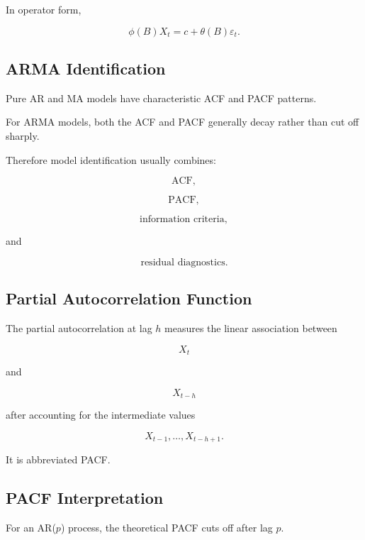 In operator form,

\[
\boxed{
\phi(B)X_t
=
c
+
\theta(B)\varepsilon_t.
}
\]

\subsection{ARMA Identification}
\label{subsec:arma-identification}

Pure AR and MA models have characteristic ACF and PACF patterns.

For ARMA models, both the ACF and PACF generally decay rather than cut off
sharply.

Therefore model identification usually combines:

\[
\boxed{
\text{ACF},
}
\]

\[
\boxed{
\text{PACF},
}
\]

\[
\boxed{
\text{information criteria},
}
\]

and

\[
\boxed{
\text{residual diagnostics}.
}
\]

\subsection{Partial Autocorrelation Function}
\label{subsec:partial-autocorrelation}

The partial autocorrelation at lag \(h\) measures the linear association
between

\[
X_t
\]

and

\[
X_{t-h}
\]

after accounting for the intermediate values

\[
X_{t-1},
\ldots,
X_{t-h+1}.
\]

It is abbreviated PACF.

\subsection{PACF Interpretation}
\label{subsec:pacf-interpretation}

For an AR(\(p\)) process, the theoretical PACF cuts off after lag \(p\).


